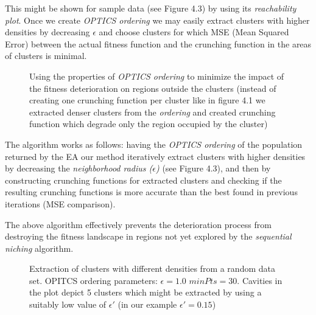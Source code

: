This might be shown for sample data (see Figure 4.3) by using its
\textit{reachability plot}. Once we create \textit{OPTICS ordering}
we may easily extract clusters with higher densities by decreasing
$\epsilon$ and choose clusters for which MSE (Mean Squared Error) 
between the actual fitness function and the crunching function in the 
areas of clusters is minimal.

\begin{figure}
  \centering
  \caption{Using the properties of \textit{OPTICS ordering} to minimize
  the impact of the fitness deterioration on regions outside the clusters 
  (instead of creating one crunching function per cluster like in figure 4.1
  we extracted denser clusters from the \textit{ordering} and created
  crunching function which degrade only the region occupied by the cluster)}
  \label{clusterDensity}
\end{figure}

 
The algorithm works as follows: having the \textit{OPTICS ordering} of the
population returned by the EA our method iteratively extract clusters with higher densities by decreasing 
the \textit{neighborhood radius ($\epsilon$)} (see Figure 4.3), and
then by constructing crunching functions for extracted clusters and checking if
the resulting crunching functions is more accurate than the best found in previous iterations (MSE comparison).

\begin{algorithmic}[1]
	\ENDIF
\ENDWHILE
\end{algorithmic}

The above algorithm effectively prevents the deterioration process
from destroying the fitness landscape in regions not yet explored by
the \textit{sequential niching} algorithm.

\begin{figure}
  \centering
  \caption{Extraction of clusters with different densities from a
  random data set. OPITCS ordering parameters: $\epsilon=1.0$ $minPts=30$.
  Cavities in the plot depict 5 clusters which might be extracted by using 
  a suitably low value of $\epsilon'$ (in our example $\epsilon'=0.15$)}
  \label{clusters}
\end{figure}
 


